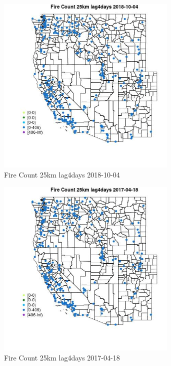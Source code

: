 \begin{figure} 
\centering  
\includegraphics[width=0.77\textwidth]{Code_Outputs/Report_ML_input_PM25_Step4_part_f_de_duplicated_aveswNAs_MapObsFire_Count_25km_lag4days2018-10-04.jpg} 
\caption{\label{fig:Report_ML_input_PM25_Step4_part_f_de_duplicated_aveswNAsMapObsFire_Count_25km_lag4days2018-10-04}Fire Count 25km lag4days 2018-10-04} 
\end{figure} 
 

\begin{figure} 
\centering  
\includegraphics[width=0.77\textwidth]{Code_Outputs/Report_ML_input_PM25_Step4_part_f_de_duplicated_aveswNAs_MapObsFire_Count_25km_lag4days2017-04-18.jpg} 
\caption{\label{fig:Report_ML_input_PM25_Step4_part_f_de_duplicated_aveswNAsMapObsFire_Count_25km_lag4days2017-04-18}Fire Count 25km lag4days 2017-04-18} 
\end{figure} 
 

